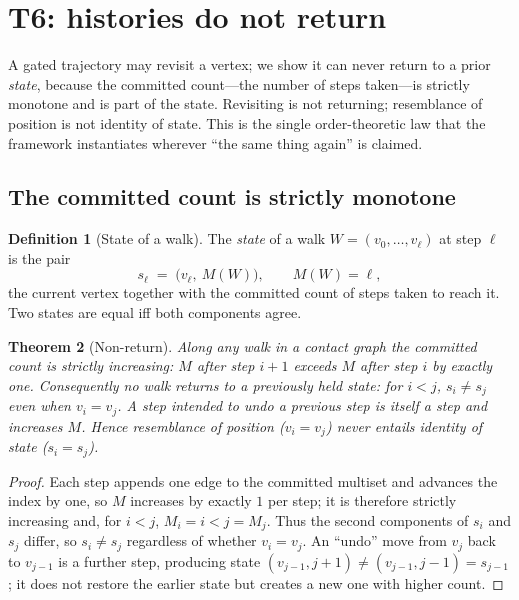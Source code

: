 \documentclass[11pt,a4paper]{article}
\theoremstyle{thmstyle}
\newtheorem{theorem}{Theorem}[section]
\theoremstyle{definition}
\newtheorem{definition}[theorem]{Definition}
\theoremstyle{remark}
\newcommand{\Walk}{W}                     %
\newcommand{\rec}{M}                      %
\begin{document}
\section{T6: histories do not return}
\label{sec:monotone}

A gated trajectory may revisit a vertex; we show it can never return to a prior
\emph{state}, because the committed count---the number of steps taken---is
strictly monotone and is part of the state. Revisiting is not returning;
resemblance of position is not identity of state. This is the single
order-theoretic law that the framework instantiates wherever ``the same thing
again'' is claimed.

\subsection{The committed count is strictly monotone}

\begin{definition}[State of a walk]
\label{def:state}
The \emph{state} of a walk $\Walk=(v_0,\dots,v_\ell)$ at step $\ell$ is the pair
\[
s_\ell\;=\;\bigl(v_\ell,\ \rec(\Walk)\bigr),\qquad \rec(\Walk)=\ell,
\]
the current vertex together with the committed count of steps taken to reach it.
Two states are equal iff both components agree.
\end{definition}

\begin{theorem}[Non-return]
\label{thm:nonreturn}
Along any walk in a contact graph the committed count is strictly increasing:
$\rec$ after step $i+1$ exceeds $\rec$ after step $i$ by exactly one. Consequently
no walk returns to a previously held state: for $i<j$, $s_i\neq s_j$ even when
$v_i=v_j$. A step intended to undo a previous step is itself a step and increases
$\rec$. Hence resemblance of position \textup{(}$v_i=v_j$\textup{)} never entails
identity of state \textup{(}$s_i=s_j$\textup{)}.
\end{theorem}

\begin{proof}
Each step appends one edge to the committed multiset and advances the index by
one, so $\rec$ increases by exactly $1$ per step; it is therefore strictly
increasing and, for $i<j$, $\rec_i=i<j=\rec_j$. Thus the second components of
$s_i$ and $s_j$ differ, so $s_i\neq s_j$ regardless of whether $v_i=v_j$. An
``undo'' move from $v_j$ back to $v_{j-1}$ is a further step, producing state
$(v_{j-1},j{+}1)\neq(v_{j-1},j{-}1)=s_{j-1}$; it does not restore the earlier
state but creates a new one with higher count.
\end{proof}
\end{document}
